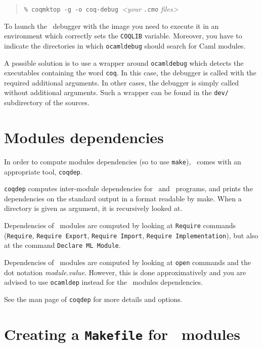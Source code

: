 \begin{quotation}
\texttt{\% coqmktop -g -o coq-debug}~\emph{<your \texttt{.cmo} files>}
\end{quotation}


To launch the \ocaml\ debugger with the image you need to execute it in
an environment which correctly sets the \texttt{COQLIB} variable.
Moreover, you have to indicate the directories in which
\texttt{ocamldebug} should search for Caml modules.

A possible solution is to use a wrapper around \texttt{ocamldebug}
which detects the executables containing the word \texttt{coq}. In
this case, the debugger is called with the required additional
arguments. In other cases, the debugger is simply called without additional
arguments. Such a wrapper can be found in the \texttt{dev/}
subdirectory of the sources. 

\section[Modules dependencies]{Modules dependencies\label{Dependencies}
  }

In order to compute modules dependencies (so to use {\tt make}),
\Coq\ comes with an appropriate tool, {\tt coqdep}.

{\tt coqdep} computes inter-module dependencies for \Coq\ and
\ocaml\ programs, and prints the dependencies on the standard
output in a format readable by make.  When a directory is given as
argument, it is recursively looked at.

Dependencies of \Coq\ modules are computed by looking at {\tt Require}
commands ({\tt Require}, {\tt Requi\-re Export}, {\tt Require Import},
{\tt Require Implementation}), but also at the command {\tt Declare ML Module}.

Dependencies of \ocaml\ modules are computed by looking at
\verb!open! commands and the dot notation {\em module.value}. However,
this is done approximatively and you are advised to use {\tt ocamldep}
instead for the \ocaml\ modules dependencies.

See the man page of {\tt coqdep} for more details and options.


\section[Creating a {\tt Makefile} for \Coq\ modules]{Creating a {\tt Makefile} for \Coq\ modules\label{Makefile}
}

